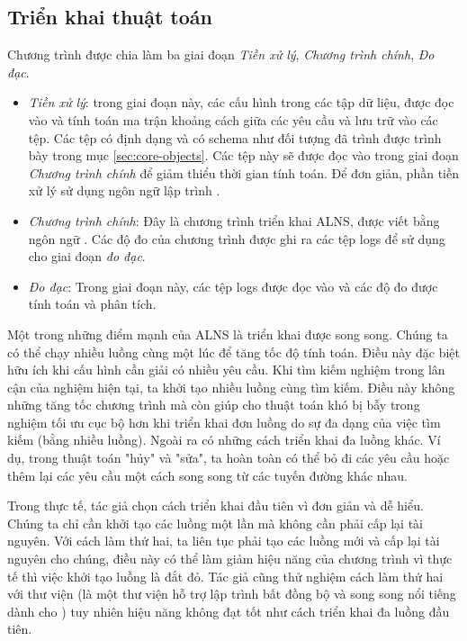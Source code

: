 \subsection{Triển khai thuật toán}
\label{sec:implement}
Chương trình được chia làm ba giai đoạn \textit{Tiền xử lý}, \textit{Chương trình chính}, \textit{Đo đạc}.
\begin{itemize}
	\item \textit{Tiền xử lý}: trong giai đoạn này, các cấu hình trong các tập dữ liệu, được đọc vào và tính toán ma trận khoảng cách giữa các yêu cầu và lưu trữ vào các tệp. Các tệp có định dạng  và có schema như đối tượng  đã trình được trình bày trong mục \ref{sec:core-objects}. Các tệp này sẽ được đọc vào trong giai đoạn \textit{Chương trình chính} để giảm thiểu thời gian tính toán. Để đơn giản, phần tiền xử lý sử dụng ngôn ngữ lập trình .
	\item \textit{Chương trình chính}: Đây là chương trình triển khai ALNS, được viết bằng ngôn ngữ . Các độ đo của chương trình được ghi ra các tệp logs để sử dụng cho giai đoạn \textit{đo đạc}.
	\item \textit{Đo đạc}: Trong giai đoạn này, các tệp logs được đọc vào và các độ đo được tính toán và phân tích.
\end{itemize}

Một trong những điểm mạnh của ALNS là triển khai được song song. Chúng ta có thể chạy nhiều luồng cùng một lúc để tăng tốc độ tính toán. Điều này đặc biệt hữu ích khi cấu hình cần giải có nhiều yêu cầu. Khi tìm kiếm nghiệm trong lân cận của nghiệm hiện tại, ta khởi tạo nhiều luồng cùng tìm kiếm. Điều này không những tăng tốc chương trình mà còn giúp cho thuật toán khó bị bẫy trong nghiệm tối ưu cục bộ hơn khi triển khai đơn luồng do sự đa dạng của việc tìm kiếm (bằng nhiều luồng). Ngoài ra có những cách triển khai đa luồng khác. Ví dụ, trong thuật toán "hủy" và "sửa", ta hoàn toàn có thể bỏ đi các yêu cầu hoặc thêm lại các yêu cầu một cách song song từ các tuyến đường khác nhau.

Trong thực tế, tác giả chọn cách triển khai đầu tiên vì đơn giản và dễ hiểu. Chúng ta chỉ cần khởi tạo các luồng một lần mà không cần phải cấp lại tài nguyên. Với cách làm thứ hai, ta liên tục phải tạo các luồng mới và cấp lại tài nguyên cho chúng, điều này có thể làm giảm hiệu năng của chương trình vì thực tế thì việc khởi tạo luồng là đắt đỏ. Tác giả cũng thử nghiệm cách làm thứ hai với thư viện  (là một thư viện hỗ trợ lập trình bất đồng bộ và song song nổi tiếng dành cho ) tuy nhiên hiệu năng không đạt tốt như cách triển khai đa luồng đầu tiên.
